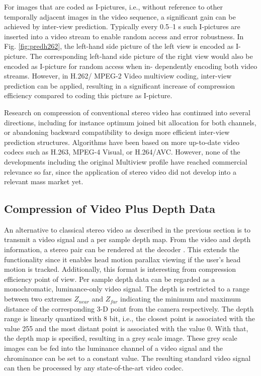 For images that are coded as I-pictures, i.e., without reference to other temporally adjacent images in the video sequence, a significant gain can be achieved by inter-view prediction. Typically every 0.5–1 s such I-pictures are inserted into a video stream to enable random access and error robustness. In Fig. \ref{fig:predh262}, the left-hand side picture of the left view is encoded as I-picture. The corresponding left-hand side picture of the right view would also be encoded as I-picture for random access when in- dependently encoding both video streams. However, in H.262/ MPEG-2 Video multiview coding, inter-view prediction can be applied, resulting in a significant increase of compression efficiency compared to coding this picture as I-picture.

Research on compression of conventional stereo video has continued into several directions, including for instance optimum joined bit allocation for both channels, or abandoning backward compatibility to design more efficient inter-view prediction structures. Algorithms have been based on more up-to-date video codecs such as H.263, MPEG-4 Visual, or H.264/AVC. However, none of the developments including the original Multiview profile have reached commercial relevance so far, since the application of stereo video did not develop into a relevant mass market yet.

\subsection{Compression of Video Plus Depth Data}

An alternative to classical stereo video as described in the previous section is to transmit a video signal and a per sample depth map. From the video and depth information, a stereo pair can be rendered at the decoder . This extends the functionality since it enables head motion parallax viewing if the user’s head motion is tracked. Additionally, this format is interesting from compression efficiency point of view. Per sample depth data can be regarded as a monochromatic, luminance-only video signal. The depth is restricted to a range between two extremes $Z_{near}$ and $Z_{far}$ indicating the minimum and maximum distance of the corresponding 3-D point from the camera respectively. The depth range is linearly quantized with 8 bit, i.e., the closest point is associated with the value 255 and the most distant point is associated with the value 0. With that, the depth map is specified, resulting in a grey scale image. These grey scale images can be fed into the luminance channel of a video signal and the chrominance can be set to a constant value. The resulting standard video signal can then be processed by any state-of-the-art video codec.

